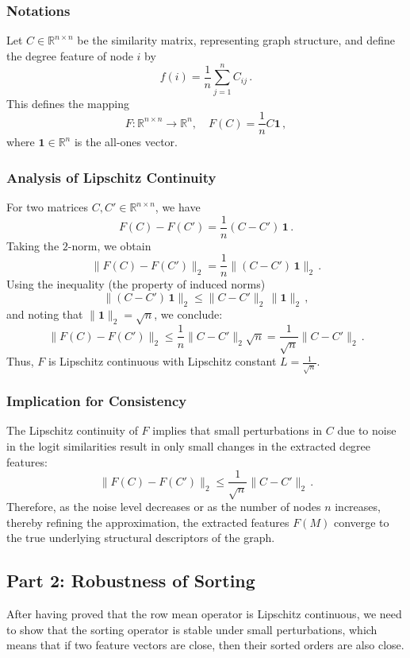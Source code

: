 \documentclass{article}
\begin{document}
\subsubsection{Notations}
Let \( C \in \mathbb{R}^{n \times n} \) be the similarity matrix, representing graph structure, and define the degree feature of node \( i \) by
\[
f(i) = \frac{1}{n} \sum_{j=1}^{n} C_{ij}\,.
\]
This defines the mapping
\[
F: \mathbb{R}^{n \times n} \to \mathbb{R}^{n}, \quad F(C) = \frac{1}{n} C \mathbf{1}\,,
\]
where \(\mathbf{1} \in \mathbb{R}^{n}\) is the all-ones vector.

\subsubsection{Analysis of Lipschitz Continuity}

For two matrices \( C, C' \in \mathbb{R}^{n \times n} \), we have
\[
F(C) - F(C') = \frac{1}{n}(C - C')\,\mathbf{1}\,.
\]
Taking the \( 2 \)-norm, we obtain
\[
\|F(C) - F(C')\|_2 = \frac{1}{n} \|(C - C')\,\mathbf{1}\|_2\,.
\]
Using the inequality (the property of induced norms) 
\[
\|(C - C')\,\mathbf{1}\|_2 \le \|C - C'\|_2\, \|\mathbf{1}\|_2\,,
\]
and noting that \(\|\mathbf{1}\|_2 = \sqrt{n}\), we conclude:
\[
\|F(C) - F(C')\|_2 \le \frac{1}{n} \|C - C'\|_2 \sqrt{n} = \frac{1}{\sqrt{n}} \|C - C'\|_2\,.
\]
Thus, \(F\) is Lipschitz continuous with Lipschitz constant \( L = \frac{1}{\sqrt{n}} \).

\subsubsection{Implication for Consistency}

The Lipschitz continuity of \(F\) implies that small perturbations in \(C\) due to noise in the logit similarities result in only small changes in the extracted degree features:
\[
\|F(C) - F(C')\|_2 \le \frac{1}{\sqrt{n}} \|C - C'\|_2\,.
\]
Therefore, as the noise level decreases or as the number of nodes \( n \) increases, thereby refining the approximation, the extracted features \( F(M) \) converge to the true underlying structural descriptors of the graph.

\subsection{Part 2: Robustness of Sorting}
\label{sorting error}
After having proved that the row mean operator is Lipschitz continuous, we need to show that the sorting operator is stable under small perturbations, which means that if two feature vectors are close, then their sorted orders are also close. 
\end{document}
